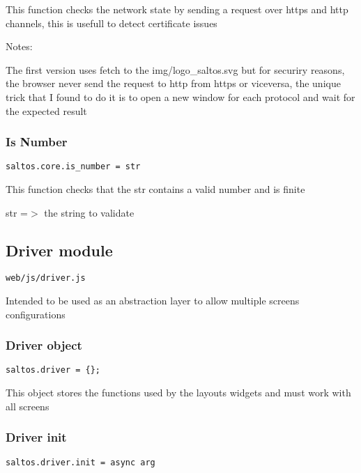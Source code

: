 \documentclass[a4paper]{article}
\begin{document}
This function checks the network state by sending a request over https and http
channels, this is usefull to detect certificate issues

Notes:

The first version uses fetch to the img/logo\_saltos.svg but for securiry reasons,
the browser never send the request to http from https or viceversa, the unique trick
that I found to do it is to open a new window for each protocol and wait for the
expected result

\hypertarget{toc722}{}
\subsubsection{Is Number}

\begin{lstlisting}
saltos.core.is_number = str
\end{lstlisting}

This function checks that the str contains a valid number and is finite

str =$>$ the string to validate

\hypertarget{toc723}{}
\subsection{Driver module}

\begin{lstlisting}
web/js/driver.js
\end{lstlisting}

Intended to be used as an abstraction layer to allow multiple screens configurations

\hypertarget{toc724}{}
\subsubsection{Driver object}

\begin{lstlisting}
saltos.driver = {};
\end{lstlisting}

This object stores the functions used by the layouts widgets and must work with all screens

\hypertarget{toc725}{}
\subsubsection{Driver init}

\begin{lstlisting}
saltos.driver.init = async arg
\end{lstlisting}
\end{document}
